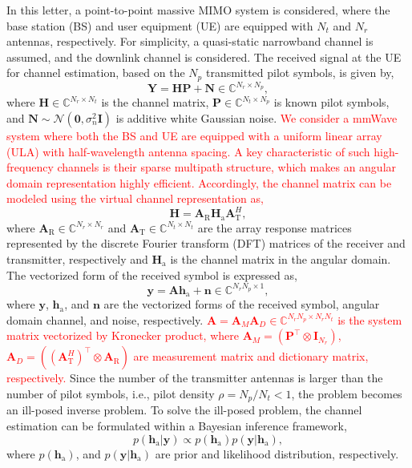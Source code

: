 \documentclass[lettersize,journal]{IEEEtran}
\newcommand{\tred}{\textcolor{red}}
\begin{document}
In this letter, a point-to-point massive MIMO system is considered, where the base station (BS) and user equipment (UE) are equipped with $N_{t}$ and $N_{r}$ antennas, respectively. For simplicity, a quasi-static narrowband channel is assumed, and the downlink channel is considered. The received signal at the UE for channel estimation, based on the $N_{p}$ transmitted pilot symbols, is given by,
\begin{equation}
\mathbf{Y}=\mathbf{H}\mathbf{P}+\mathbf{N}\in \mathbb{C}^{N_{r}\times N_{p}},
\end{equation}
where $\mathbf{H}\in \mathbb{C}^{N_{r}\times N_{t}}$ is the channel matrix, $\mathbf{P}\in \mathbb{C}^{N_{t}\times N_{p}}$ is known pilot symbols, and $\mathbf{N}\sim\mathcal{N}(\mathbf{0},\sigma^{2}_{n}\mathbf{I})$ is additive white Gaussian noise. \tred{We consider a mmWave system where both the BS and UE are equipped with a uniform linear array (ULA) with half-wavelength antenna spacing. A key characteristic of such high-frequency channels is their sparse multipath structure, which makes an angular domain representation highly efficient. Accordingly, the channel matrix can be modeled using the virtual channel representation as,}
\begin{equation}
\mathbf{H} = \mathbf{A}_{\text{R}}\mathbf{H}_{\text{a}}\mathbf{A}_{\text{T}}^{H},
\end{equation}
where $\mathbf{A}_{\text{R}}\in \mathbb{C}^{N_{r}\times N_{r}}$ and $\mathbf{A}_{\text{T}}\in \mathbb{C}^{N_{t}\times N_{t}}$ are the array response matrices represented by the discrete Fourier transform (DFT) matrices of the receiver and transmitter, respectively and $\mathbf{H}_{\text{a}}$ is the channel matrix in the angular domain.
The vectorized form of the received symbol is expressed as,
\begin{equation}
\mathbf{y} = \mathbf{A}\mathbf{h}_{\text{a}}+\mathbf{n}\in \mathbb{C}^{N_{r}N_{p}\times 1},
\end{equation}
where $\mathbf{y}$, $\mathbf{h}_{\text{a}}$, and $\mathbf{n}$ are the vectorized forms of the received symbol, angular domain channel, and noise, respectively. \tred{$\mathbf{A}=\mathbf{A}_{M}\mathbf{A}_{D}\in \mathbb{C}^{N_{r}N_{p}\times N_{r}N_{t}}$ is the system matrix vectorized by Kronecker product, where $\mathbf{A}_{M} = (\mathbf{P}^{\top}\otimes\mathbf{I}_{N_{r}})$, $\mathbf{A}_{D}=((\mathbf{A}_{\text{T}}^{H})^{\top}\otimes \mathbf{A}_{\text{R}})$ are measurement matrix and dictionary matrix, respectively.}
Since the number of the transmitter antennas is larger than the number of pilot symbols, i.e., pilot density $\rho=N_{p}/N_{t}<1$, the problem becomes an ill-posed inverse problem.
To solve the ill-posed problem, the channel estimation can be formulated within a Bayesian inference framework,
\begin{equation}
  p(\mathbf{h}_{\text{a}}|\mathbf{y})\propto p(\mathbf{h}_{\text{a}})p(\mathbf{y}|\mathbf{h}_{\text{a}}),
\end{equation}
where $p(\mathbf{h}_{\text{a}})$, and $p(\mathbf{y}|\mathbf{h}_{\text{a}})$ are prior and likelihood distribution, respectively.
\end{document}
